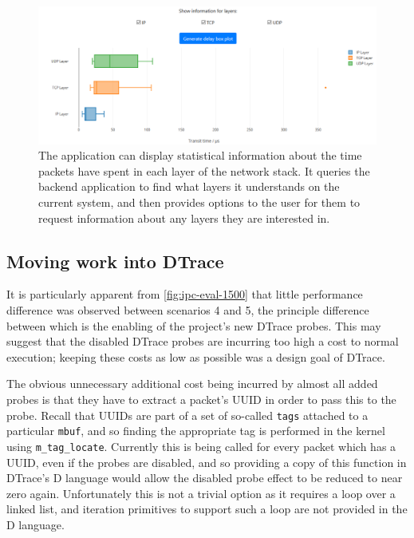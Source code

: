 \documentclass[a4paper,12pt,twoside,openright]{report}
\begin{document}
	\begin{figure}[b]
		\centering
		\includegraphics[width=\linewidth]{include/ui-timing-box.png}
		\caption{The application can display statistical information about the time packets have spent in each layer of the network stack. It queries the backend application to find what layers it understands on the current system, and then provides options to the user for them to request information about any layers they are interested in.}
		\label{fig:ui-timing-box}
	\end{figure}
	
	\subsection{Moving work into DTrace}
	\label{sec:dtrace-iteration}
	
	It is particularly apparent from \figurename{ \ref{fig:ipc-eval-1500}} that little performance difference was observed between scenarios 4 and 5, the principle difference between which is the enabling of the project's new DTrace probes. This may suggest that the disabled DTrace probes are incurring too high a cost to normal execution; keeping these costs as low as possible was a design goal of DTrace\cite{Gregg-DTrace}.
	
	The obvious unnecessary additional cost being incurred by almost all added probes is that they have to extract a packet's UUID in order to pass this to the probe. Recall that UUIDs are part of a set of so-called \texttt{tags} attached to a particular \verb|mbuf|, and so finding the appropriate tag is performed in the kernel using \verb|m_tag_locate|. Currently this is being called for every packet which has a UUID, even if the probes are disabled, and so providing a copy of this function in DTrace's D language would allow the disabled probe effect to be reduced to near zero again. Unfortunately this is not a trivial option as it requires a loop over a linked list, and iteration primitives to support such a loop are not provided in the D language.
	
\end{document}
